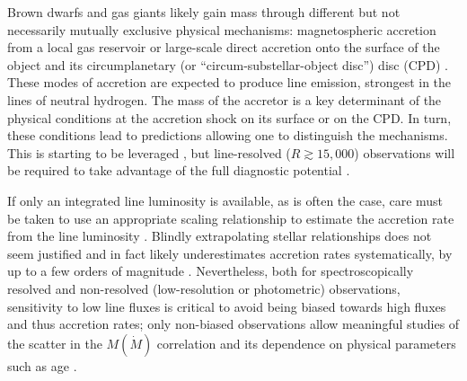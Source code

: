\documentclass[twocolumn,twocolumnappendix]{aastex631}
\newcommand{\neuI}[1]{{\leavevmode{\boldmath\bfseries#1}}}
\renewcommand{\neuI}[1]{{\leavevmode#1}}
\def\MPkt{\ensuremath{\dot{M}}\xspace}                               %
\begin{document}
\neuI{%
Brown dwarfs and gas giants likely gain mass through different but not necessarily mutually exclusive physical mechanisms: 
%
magnetospheric accretion from a local gas reservoir \citep[e.g.,][]{calvetgull98,hartmann16,thanathibodee19,hasegawa24}
or
large-scale direct accretion onto the surface of the object and its circumplanetary (or ``circum-substellar-object disc'') disc (CPD) \citep[e.g.,][]{tanigawa12,aoyama18,m22Schock}.
These modes of accretion are expected to produce line emission, strongest in the lines of neutral hydrogen.
The mass of the accretor is a key determinant of the physical conditions at the accretion shock on its surface or on the CPD. In turn, these conditions lead to predictions allowing one to distinguish the mechanisms. This is starting to be leveraged \citep{demars23}, but line-resolved ($R\gtrsim15,000$) observations will be required to take advantage of the full diagnostic potential \citep{maea21}.
}

\neuI{%
If only an integrated line luminosity is available, as is often the case, care must be taken to use an appropriate scaling relationship to estimate the accretion rate from the line luminosity \citep{betti23}.
Blindly extrapolating stellar relationships does not seem justified and in fact likely underestimates accretion rates systematically, by up to a few orders of magnitude \citep{AMIM21L,ma22}.
Nevertheless, both for spectroscopically resolved and non-resolved (low-resolution or photometric) observations, sensitivity to low line fluxes is critical to avoid being biased towards high fluxes and thus accretion rates; only non-biased observations allow meaningful studies of the scatter in the $M(\MPkt)$ correlation and its dependence on physical parameters such as age \citep{betti23}.
}
\end{document}
